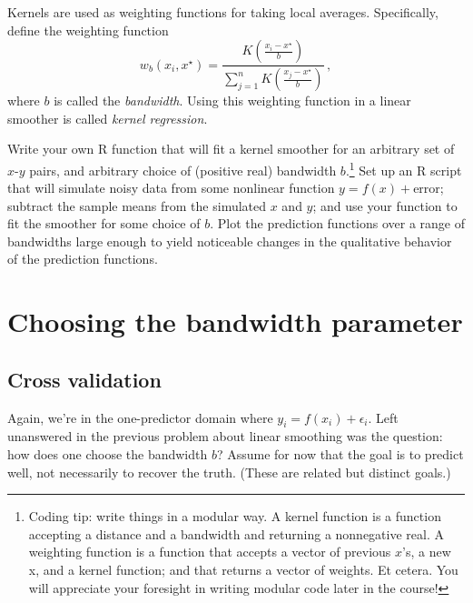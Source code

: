 \documentclass{mynotes}
\begin{document}
\begin{enumerate}[(A)]
Kernels are used as weighting functions for taking local averages.  Specifically, define the weighting function
$$
w_b(x_i, x^{\star}) = \frac{ K \left( \frac{x_i - x^{\star}}{b} \right) }{\sum_{j=1}^n  K \left( \frac{x_j - x^{\star}}{b} \right)  } \, ,
$$
where $b$ is called the \textit{bandwidth}.   Using this weighting function in a linear smoother is called \textit{kernel regression}.  

Write your own R function that will fit a kernel smoother for an arbitrary set of $x$-$y$ pairs, and arbitrary choice of (positive real) bandwidth $b$.\footnote{Coding tip: write things in a modular way.  A kernel function is a function accepting a distance and a bandwidth and returning a nonnegative real.  A weighting function is a function that accepts a vector of previous $x$'s, a new x, and a kernel function; and that returns a vector of weights.  Et cetera.  You will appreciate your foresight in writing modular code later in the course!}  Set up an R script that will simulate noisy data from some nonlinear function $y = f(x) + \mbox{error}$; subtract the sample means from the simulated $x$ and $y$; and use your function to fit the smoother for some choice of $b$.  Plot the prediction functions over a range of bandwidths large enough to yield noticeable changes in the qualitative behavior of the prediction functions.

\end{enumerate}


\section{Choosing the bandwidth parameter}

\subsection{Cross validation}

Again, we're in the one-predictor domain where $y_i = f(x_i) + \epsilon_i$.  Left unanswered in the previous problem about linear smoothing was the question: how does one choose the bandwidth $b$?  Assume for now that the goal is to predict well, not necessarily to recover the truth.  (These are related but distinct goals.)  
\end{document}

